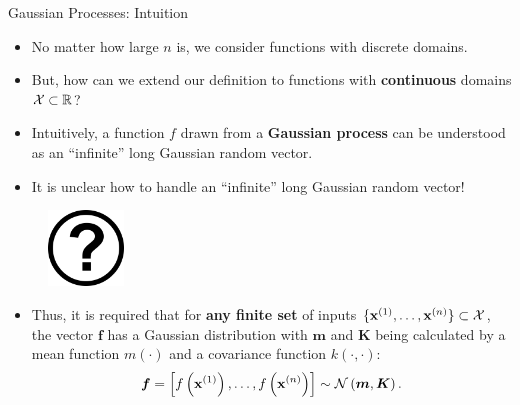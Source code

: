 \begin{frame}[c,allowframebreaks]{Gaussian Processes: Intuition}


\begin{itemize}
  \item  No matter how large $n$ is, we consider functions with discrete domains.
\vspace{.3cm}
  \item But, how can we extend our definition to functions with \textbf{continuous} domains $\mathcal{X} \subset \mathbb{R}$?
\vspace{.3cm}
  \item Intuitively, a function $f$ drawn from a \textbf{Gaussian process} can be understood as an ``infinite'' long Gaussian random vector.
\vspace{.3cm}
  \item It is unclear how to handle an ``infinite'' long Gaussian random vector!
\end{itemize}

\vspace{.3cm}

\begin{figure}
\includegraphics[width=0.18\textwidth]{figure_man/question.png}
\end{figure}
\framebreak

\begin{itemize}
\item Thus, it is required that for \textbf{any finite set} of inputs $\{\mathbf{x}^{(1)},\dots,\mathbf{x}^{(n)}\} \subset \mathcal{X}$, the vector $\mathbf{f}$ has a Gaussian distribution with $\bm{m}$ and $\bm{K}$ being calculated by a mean function $m(\cdot)$ and a covariance function $k(\cdot,\cdot)$:\vspace{-.2cm}$$\bm{f} = \left[f\left(\mathbf{x}^{(1)}\right),\dots, f\left(\mathbf{x}^{(n)}\right)\right] \sim\mathcal{N}\left(\bm{m},\bm{K}\right).$$
    

\end{itemize}
\end{frame}
